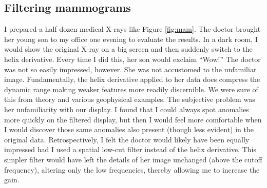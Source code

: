 \subsection{Filtering mammograms}

\par
I prepared a half dozen medical X-rays like Figure 
\ref{fig:mam}.
The doctor brought her young son to my office one evening
to evaluate the results.
In a dark room, I would show the original X-ray on a big screen
and then suddenly switch to the helix derivative.
Every time I did this, her son would exclaim ``Wow!''
The doctor was not so easily impressed, however.
She was not accustomed to the unfamiliar image.
Fundamentally, the helix derivative applied to her data
does compress the dynamic range making weaker features more readily discernible.
We were sure of this from theory and 
various geophysical examples.
The subjective problem was her unfamiliarity with our display.
I found that I could always spot anomalies more quickly
on the filtered display, but then I would feel more comfortable
when I would discover those same anomalies also present
(though less evident) in the original data.
Retrospectively, I felt the doctor would likely have been equally impressed
had I used a spatial low-cut filter instead of the helix derivative.
This simpler filter would have left the details of her image unchanged
(above the cutoff frequency), altering only the low frequencies,
thereby allowing me to increase the gain.

